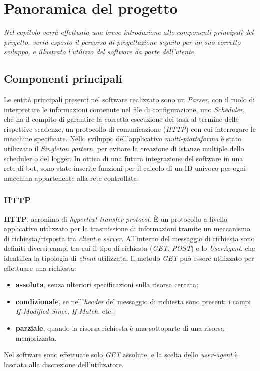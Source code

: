 \chapter{Panoramica del progetto}
\begin{minipage}{12cm}\textit{Nel capitolo verr\`{a} effettuata una breve introduzione alle componenti principali del progetto, verr\`{a} esposto il percorso di progettazione seguito per un suo corretto sviluppo, e illustrato l'utilizzo del software da parte dell'utente.}
\end{minipage}

\vspace*{1cm}
\section{Componenti principali}
Le entit\`{a} principali presenti nel software realizzato sono un \textit{Parser}, con il ruolo di interpretare le informazioni contenute nel file di configurazione, uno \textit{Scheduler}, che ha il compito di garantire la corretta esecuzione dei task al termine delle rispettive scadenze, un protocollo di comunicazione (\textit{HTTP}) con cui interrogare le macchine specificate. Nello sviluppo dell'applicativo \textit{multi-piattaforma} \`{e} stato utilizzato il \textit{Singleton pattern}, per evitare la creazione di istanze multiple dello scheduler o del logger.
In ottica di una futura integrazione del software in una rete di bot, sono state inserite funzioni per il calcolo di un ID univoco per ogni macchina appartenente alla rete controllata.

\vspace*{0.5cm}
\subsection{HTTP}
\textbf{HTTP}, acronimo di \textit{hypertext transfer protocol}.
\`E un protocollo a livello applicativo utilizzato per la
trasmissione di informazioni tramite un meccanismo di richiesta/risposta tra \textit{client} e \textit{server}. All'interno del messaggio di richiesta sono definiti diversi campi tra cui il tipo di
richiesta (\textit{GET}, \textit{POST}) e lo \textit{UserAgent}, che identifica la tipologia di \textit{client} utilizzata.
Il metodo \textit{GET} pu\`{o} essere utilizzato per effettuare una richiesta:
\begin{itemize}
	\item \textbf{assoluta}, senza ulteriori specificazioni sulla risorsa cercata;
	\item \textbf{condizionale}, se nell'\textit{header} del messaggio di richiesta sono presenti i campi \textit{If-Modified-Since}, \textit{If-Match}, etc.;
	\item \textbf{parziale}, quando la risorsa richiesta \`e una sottoparte di una risorsa memorizzata.
\end{itemize}
Nel software sono effettuate solo \textit{GET} assolute, e la scelta dello \textit{user-agent} \`{e} lasciata alla discrezione dell'utilizatore.

